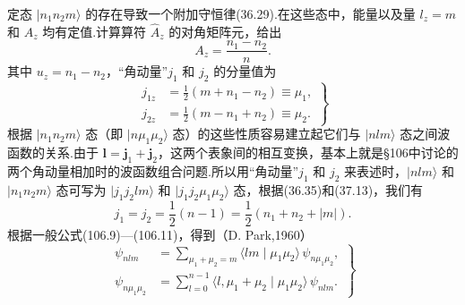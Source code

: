 定态 $|n_1n_2m\rangle$ 的存在导致一个附加守恒律(36.29).在这些态中，能量以及量 $l_z=m$ 和 $A_z$ 均有定值.计算算符 $\hat{A}_z$ 的对角矩阵元，给出
\begin{equation}
  A_z=\frac{n_1-n_2}{n}.
\end{equation}
其中 $u_z=n_1-n_2$，“角动量”$j_1$ 和 $j_2$ 的分量值为
\begin{equation}
\left.\begin{aligned}
  j_{1z}&=\frac{1}{2}(m+n_1-n_2)\equiv\mu_1,\\
  j_{2z}&=\frac{1}{2}(m-n_1+n_2)\equiv\mu_2.
\end{aligned}\right\}
\end{equation}
根据 $|n_1n_2m\rangle$ 态（即 $|n\mu_1\mu_2\rangle$ 态）的这些性质容易建立起它们与 $|nlm\rangle$ 态之间波函数的关系.由于 $\boldsymbol{l}=\boldsymbol{j}_1+\boldsymbol{j}_2$，这两个表象间的相互变换，基本上就是§106中讨论的两个角动量相加时的波函数组合问题.所以用“角动量”$j_1$ 和 $j_2$ 来表述时，$|nlm\rangle$ 和 $|n_1n_2m\rangle$ 态可写为 $|j_1j_2lm\rangle$ 和 $|j_1j_2\mu_1\mu_2\rangle$ 态，根据(36.35)和(37.13)，我们有
\begin{equation}
  j_1=j_2=\frac{1}{2}(n-1)=\frac{1}{2}(n_1+n_2+|m|).
\end{equation}
根据一般公式(106.9)—(106.11)，得到（D. Park,1960）
\begin{equation}
\left.\begin{aligned}
  \psi_{nlm}&=\sum_{\mu_1+\mu_2=m}
  \langle lm\mid\mu_1\mu_2\rangle\,\psi_{n\mu_1\mu_2},\\
  \psi_{n\mu_1\mu_2}&=\sum_{l=0}^{n-1}
  \langle l,\mu_1+\mu_2\mid\mu_1\mu_2\rangle\,\psi_{nlm}.
\end{aligned}\right\}
\end{equation}